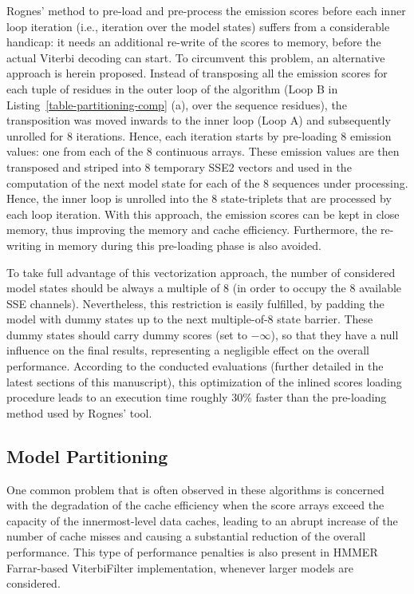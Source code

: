 \documentclass{bmcart}
\begin{document}
Rognes' method to pre-load and pre-process the emission scores before each inner loop iteration (i.e., iteration over the model states) suffers from a considerable handicap: it needs an additional re-write of the scores to memory, before the actual Viterbi decoding can start. To circumvent this problem, an alternative approach is herein proposed. Instead of transposing all the emission scores for each tuple of residues in the outer loop of the algorithm (Loop B in Listing~\autoref{table-partitioning-comp} (a), over the sequence residues), the transposition was moved inwards to the inner loop (Loop A) and subsequently unrolled for 8 iterations. Hence, each iteration starts by pre-loading 8 emission values: one from each of the 8 continuous arrays. These emission values are then transposed and striped into 8 temporary SSE2 vectors and used in the computation of the next model state for each of the 8 sequences under processing. Hence, the inner loop is unrolled into the 8 state-triplets that are processed by each loop iteration. With this approach, the emission scores can be kept in close memory, thus improving the memory and cache efficiency. Furthermore, the re-writing in memory during this pre-loading phase is also avoided.

To take full advantage of this vectorization approach, the number of considered model states should be always a multiple of 8 (in order to occupy the 8 available SSE channels). Nevertheless,  this restriction is easily fulfilled, by padding the model with dummy states up to the next multiple-of-8 state barrier. These dummy states should carry dummy scores (set to $-\infty$), so that they have a null influence on the final results, representing a negligible effect on the overall performance. According to the conducted evaluations (further detailed in the latest sections of this manuscript), this optimization of the inlined scores loading procedure leads to an execution time roughly 30\% faster than the pre-loading method used by Rognes' tool.

\subsection*{Model Partitioning }

One common problem that is often observed in these algorithms is concerned with the degradation of the cache efficiency when the score arrays exceed the capacity of the innermost-level data caches, leading to an abrupt increase of the number of cache misses and causing a substantial reduction of the overall performance. This type of performance penalties is also present in HMMER Farrar-based ViterbiFilter implementation, whenever larger models are considered. 
\end{document}
